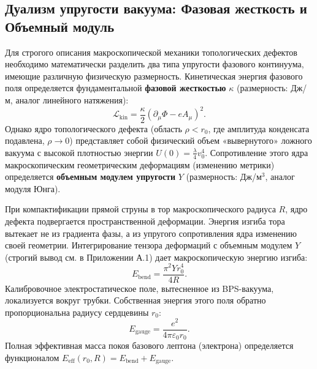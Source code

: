 \documentclass[11pt,a4paper]{article}
\begin{document}
	\subsection{Дуализм упругости вакуума: Фазовая жесткость и Объемный модуль}
	Для строгого описания макроскопической механики топологических дефектов необходимо математически разделить два типа упругости фазового континуума, имеющие различную физическую размерность.
	Кинетическая энергия фазового поля определяется фундаментальной \textbf{фазовой жесткостью} $\kappa$ (размерность: Дж/м, аналог линейного натяжения):
	\begin{equation}
		\mathcal{L}_{\text{kin}} = \frac{\kappa}{2} (\partial_\mu \Phi - e A_\mu)^2.
	\end{equation}
	Однако ядро топологического дефекта (область $\rho < r_0$, где амплитуда конденсата подавлена, $\rho \to 0$) представляет собой физический объем «вывернутого» ложного вакуума с высокой плотностью энергии $U(0) = \frac{\lambda}{4}v_0^4$. Сопротивление этого ядра макроскопическим геометрическим деформациям (изменению метрики) определяется \textbf{объемным модулем упругости} $Y$ (размерность: Дж/м$^3$, аналог модуля Юнга). 
	
	При компактификации прямой струны в тор макроскопического радиуса $R$, ядро дефекта подвергается пространственной деформации. Энергия изгиба тора вытекает не из градиента фазы, а из упругого сопротивления ядра изменению своей геометрии. Интегрирование тензора деформаций с объемным модулем $Y$ (строгий вывод см. в Приложении А.1) дает макроскопическую энергию изгиба:
	\begin{equation}
		E_{\text{bend}} = \frac{\pi^2 Y r_0^4}{4 R}.
	\end{equation}
	Калибровочное электростатическое поле, вытесненное из BPS-вакуума, локализуется вокруг трубки. Собственная энергия этого поля обратно пропорциональна радиусу сердцевины $r_0$:
	\begin{equation}
		E_{\text{gauge}} = \frac{e^2}{4\pi\varepsilon_0 r_0}.
	\end{equation}
	Полная эффективная масса покоя базового лептона (электрона) определяется функционалом $E_{\text{eff}}(r_0, R) = E_{\text{bend}} + E_{\text{gauge}}$.
	
\end{document}
